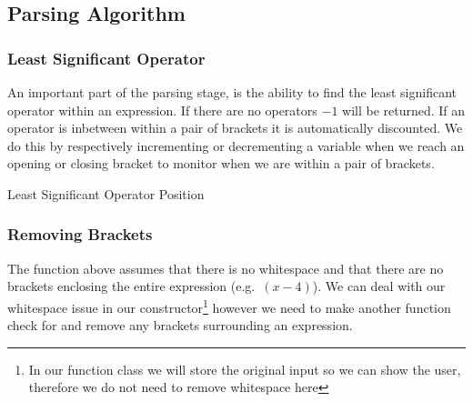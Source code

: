\documentclass[../../../../../main.tex]{subfiles}
\begin{document}
\subsection{Parsing Algorithm}
\subsubsection{Least Significant Operator}
An important part of the parsing stage, is the ability to find the least significant operator within an expression. If there are no operators $-1$ will be returned. If an operator is inbetween within a pair of brackets it is automatically discounted. We do this by respectively incrementing or decrementing a variable when we reach an opening or closing bracket to monitor when we are within a pair of brackets.
\begin{algorithm}
\caption{Least Significant Operator Position}
\DontPrintSemicolon
{}
\end{algorithm}
\subsubsection{Removing Brackets}
The function above assumes that there is no whitespace and that there are no brackets enclosing the entire expression (e.g.\ $(x-4)$). We can deal with our whitespace issue in our constructor\footnote{In our function class we will store the original input so we can show the user, therefore we do not need to remove whitespace here} however we need to make another function check for and remove any brackets surrounding an expression.
\end{document}
